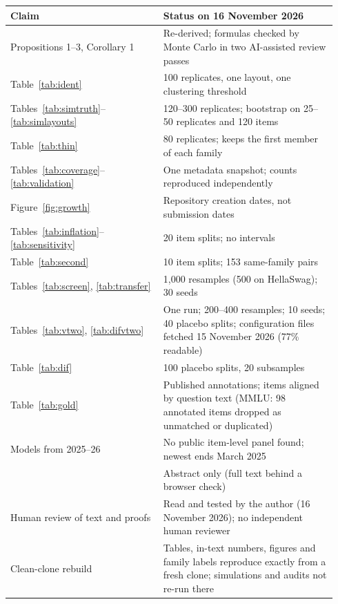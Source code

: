 \documentclass[10pt]{article}
\theoremstyle{remark}\newtheorem{remark}{Remark}
\begin{document}
\begin{tabular}{p{0.44\linewidth}p{0.50\linewidth}}
\toprule
Claim & Status on 16 November 2026\\
\midrule
Propositions 1--3, Corollary 1 & Re-derived; formulas checked by Monte Carlo in two AI-assisted review passes\\
Table~\ref{tab:ident} & 100 replicates, one layout, one clustering threshold\\
Tables~\ref{tab:simtruth}--\ref{tab:simlayouts} & 120--300 replicates; bootstrap on 25--50 replicates and 120 items\\
Table~\ref{tab:thin} & 80 replicates; keeps the first member of each family\\
Tables~\ref{tab:coverage}--\ref{tab:validation} & One metadata snapshot; counts reproduced independently\\
Figure~\ref{fig:growth} & Repository creation dates, not submission dates\\
Tables~\ref{tab:inflation}--\ref{tab:sensitivity} & 20 item splits; no intervals\\
Table~\ref{tab:second} & 10 item splits; 153 same-family pairs\\
Tables~\ref{tab:screen}, \ref{tab:transfer} & 1,000 resamples (500 on HellaSwag); 30 seeds\\
Tables~\ref{tab:vtwo}, \ref{tab:difvtwo} & One run; 200--400 resamples; 10 seeds; 40 placebo splits; configuration files fetched 15 November 2026 (77\% readable)\\
Table~\ref{tab:dif} & 100 placebo splits, 20 subsamples\\
Table~\ref{tab:gold} & Published annotations; items aligned by question text (MMLU: 98 annotated items dropped as unmatched or duplicated)\\
Models from 2025--26 & No public item-level panel found; newest ends March 2025\\
\citet{dif2026llm} & Abstract only (full text behind a browser check)\\
Human review of text and proofs & Read and tested by the author (16 November 2026); no independent human reviewer\\
Clean-clone rebuild & Tables, in-text numbers, figures and family labels reproduce exactly from a fresh clone; simulations and audits not re-run there\\
\bottomrule
\end{tabular}
\fi
\end{document}
